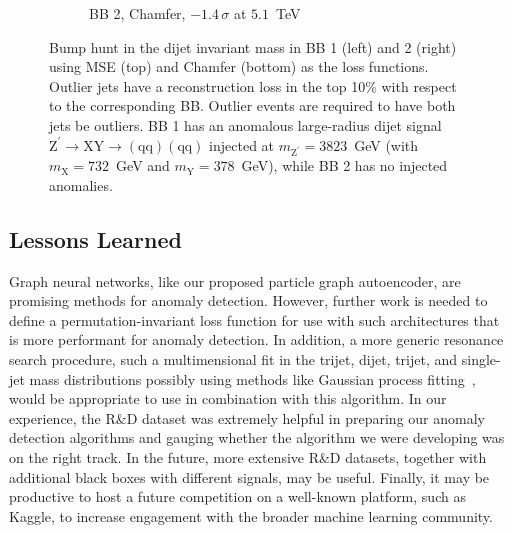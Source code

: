 \documentclass[letterpaper,11pt]{article}
\newcommand{\PZpr}{\ensuremath{\mathrm{Z}^{\prime}}\xspace} %
\newcommand{\PX}{\ensuremath{\mathrm{X}}\xspace} %
\newcommand{\PY}{\ensuremath{\mathrm{Y}}\xspace} %
\newcommand{\Pq}{\ensuremath{\mathrm{q}}\xspace} %
\begin{document}
\begin{figure}[htpb]
\begin{subfigure}[b]{0.45\textwidth}
        \caption*{BB 2, Chamfer, $-1.4\,\sigma$ at $5.1$~TeV}
    \end{subfigure}
\caption{Bump hunt in the dijet invariant mass in BB 1 (left) and 2 (right) using MSE (top) and Chamfer (bottom) as the loss functions.
Outlier jets have a reconstruction loss in the top 10\% with respect to the corresponding BB. 
Outlier events are required to have both jets be outliers.
BB 1 has an anomalous large-radius dijet signal $\PZpr \to \PX\PY \to (\Pq\Pq)(\Pq\Pq)$ injected at $m_\PZpr=3823$~GeV (with $m_\PX = 732$~GeV and $m_\PY= 378$~GeV), while BB 2 has no injected anomalies.
}
\label{fig:gnnaebumps}
\end{figure}



\subsection{Lessons Learned}
\label{sec:lessons}

Graph neural networks, like our proposed particle graph autoencoder, are promising methods for anomaly detection.
However, further work is needed to define a permutation-invariant loss function for use with such architectures that is more performant for anomaly detection.
In addition, a more generic resonance search procedure, such a multimensional fit in the trijet, dijet, trijet, and single-jet mass distributions possibly using methods like Gaussian process fitting~\cite{Frate:2017mai}, would be appropriate to use in combination with this algorithm.
In our experience, the R\&D dataset was extremely helpful in preparing our anomaly detection algorithms and gauging whether the algorithm we were developing was on the right track. 
In the future, more extensive R\&D datasets, together with additional black boxes with different signals, may be useful.
Finally, it may be productive to host a future competition on a well-known platform, such as Kaggle, to increase engagement with the broader machine learning community.
\end{document}
